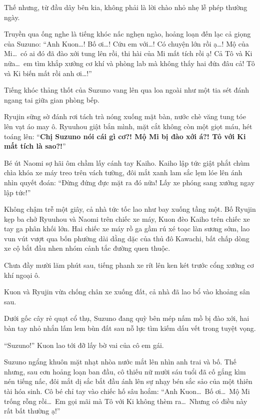 \documentclass[../main.tex]{subfiles}
\begin{document}
Thế nhưng, từ đầu dây bên kia, không phải là lời chào nhỏ nhẹ lễ phép thường ngày.

Truyền qua ống nghe là tiếng khóc nấc nghẹn ngào, hoảng loạn đến lạc cả giọng của Suzuno: ``Anh Kuon\dots! Bố ơi\dots! Cứu em với\dots! Có chuyện lớn rồi ạ\dots! Mộ của Mi\dots\ có ai đó đã đào xới tung lên rồi, thi hài của Mi mất tích rồi ạ! Cả Tô và Ki nữa\dots\ em tìm khắp xưởng cơ khí và phòng lab mà không thấy hai đứa đâu cả! Tô và Ki biến mất rồi anh ơi\dots!''

Tiếng khóc thảng thốt của Suzuno vang lên qua loa ngoài như một tia sét đánh ngang tai giữa gian phòng bếp.

Ryujin sững sờ đánh rơi tách trà nóng xuống mặt bàn, nước chè văng tung tóe lên vạt áo may ô. Ryuuhou giật bắn mình, mặt cắt không còn một giọt máu, hét toáng lên: ``\textbf{Chị Suzuno nói cái gì cơ?! Mộ Mi bị đào xới á?! Tô với Ki mất tích là sao?!}''

Bé út Naomi sợ hãi ôm chầm lấy cánh tay Kaiho. Kaiho lập tức giật phắt chùm chìa khóa xe máy treo trên vách tường, đôi mắt xanh lam sắc lẹm lóe lên ánh nhìn quyết đoán: ``Đừng đứng đực mặt ra đó nữa! Lấy xe phóng sang xưởng ngay lập tức!''

Không chậm trễ một giây, cả nhà tức tốc lao như bay xuống tầng một. Bố Ryujin kẹp ba chở Ryuuhou và Naomi trên chiếc xe máy, Kuon đèo Kaiho trên chiếc xe tay ga phân khối lớn. Hai chiếc xe máy rồ ga gầm rú xé toạc làn sương sớm, lao vun vút vượt qua bốn phường dài dằng dặc của thủ đô Kawachi, bất chấp dòng xe cộ bắt đầu nhen nhóm cảnh tắc đường quen thuộc.

\ct

Chưa đầy mười lăm phút sau, tiếng phanh xe rít lên ken két trước cổng xưởng cơ khí ngoại ô.

Kuon và Ryujin vừa chống chân xe xuống đất, cả nhà đã lao bổ vào khoảng sân sau.

Dưới gốc cây rẻ quạt cổ thụ, Suzuno đang quỳ bên mép nấm mồ bị đào xới, hai bàn tay nhỏ nhắn lấm lem bùn đất sau nỗ lực tìm kiếm dấu vết trong tuyệt vọng.

``Suzuno!'' Kuon lao tới đỡ lấy bờ vai của cô em gái.

Suzuno ngẩng khuôn mặt nhạt nhòa nước mắt lên nhìn anh trai và bố. Thế nhưng, sau cơn hoảng loạn ban đầu, cô thiếu nữ mười sáu tuổi đã cố gắng kìm nén tiếng nấc, đôi mắt dị sắc bắt đầu ánh lên sự nhạy bén sắc sảo của một thiên tài hóa sinh. Cô bé chỉ tay vào chiếc hố sâu hoắm: ``Anh Kuon\dots\ Bố ơi\dots\ Mộ Mi trống rỗng rồi\dots\ Em gọi mãi mà Tô với Ki không thèm ra\dots\ Nhưng có điều này rất bất thường ạ!''
\end{document}
